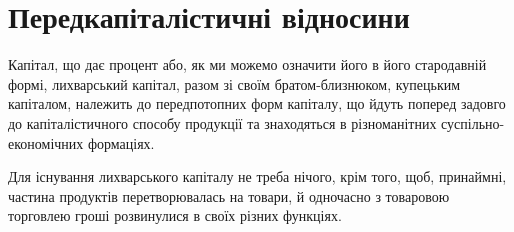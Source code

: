 \section{Передкапіталістичні відносини}

Капітал, що дає процент або, як ми можемо означити його в його стародавній
формі, лихварський капітал, разом зі своїм братом-близнюком, купецьким
капіталом, належить до передпотопних форм капіталу, що йдуть поперед задовго
до капіталістичного способу продукції та знаходяться в різноманітних
суспільно-економічних формаціях.

Для існування лихварського капіталу не треба нічого, крім того, щоб,
принаймні, частина продуктів перетворювалась на товари, й одночасно з товаровою
торговлею гроші розвинулися в своїх різних функціях.
